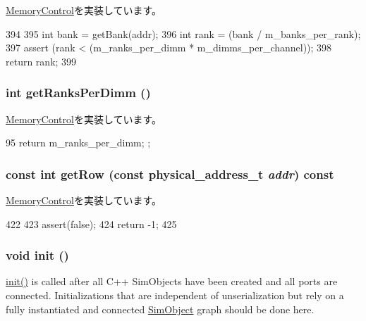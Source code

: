 \hyperlink{classMemoryControl_a22565804f54291d8c37b7456c157f814}{MemoryControl}を実装しています。


\begin{DoxyCode}
394 {
395     int bank = getBank(addr);
396     int rank = (bank / m_banks_per_rank);
397     assert (rank < (m_ranks_per_dimm * m_dimms_per_channel));
398     return rank;
399 }
\end{DoxyCode}
\hypertarget{classRubyMemoryControl_a6dff017ebfbd9d5b021b86437ff67acc}{
\subsubsection[{getRanksPerDimm}]{\setlength{\rightskip}{0pt plus 5cm}int getRanksPerDimm ()}}
\label{classRubyMemoryControl_a6dff017ebfbd9d5b021b86437ff67acc}


\hyperlink{classMemoryControl_a8fc5f029d5373799975a32fcd559400c}{MemoryControl}を実装しています。


\begin{DoxyCode}
95 { return m_ranks_per_dimm; };
\end{DoxyCode}
\hypertarget{classRubyMemoryControl_a65314c26cf3c85d8c911524ede56456c}{
\subsubsection[{getRow}]{\setlength{\rightskip}{0pt plus 5cm}const int getRow (const {\bf physical\_\-address\_\-t} {\em addr}) const}}
\label{classRubyMemoryControl_a65314c26cf3c85d8c911524ede56456c}


\hyperlink{classMemoryControl_a86eabafc0d8d68214de261fc7a333a04}{MemoryControl}を実装しています。


\begin{DoxyCode}
422 {
423     assert(false);
424     return -1;
425 }
\end{DoxyCode}
\hypertarget{classRubyMemoryControl_a02fd73d861ef2e4aabb38c0c9ff82947}{
\subsubsection[{init}]{\setlength{\rightskip}{0pt plus 5cm}void init ()}}
\label{classRubyMemoryControl_a02fd73d861ef2e4aabb38c0c9ff82947}
\hyperlink{classRubyMemoryControl_a02fd73d861ef2e4aabb38c0c9ff82947}{init()} is called after all C++ SimObjects have been created and all ports are connected. Initializations that are independent of unserialization but rely on a fully instantiated and connected \hyperlink{classSimObject}{SimObject} graph should be done here. 

